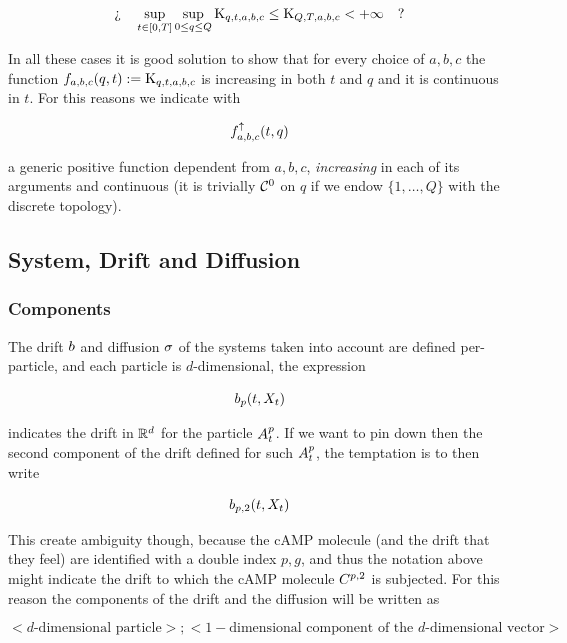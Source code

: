 \begin{equation*}
	\logQuest{
		\sup_{t \in [0,T]} \sup_{0\leq q \leq Q} \const_{q,t,a,b,c} \leq \const_{Q,T,a,b,c}  < +\infty
	}
\end{equation*}

In all these cases it is good solution to show that for every choice of $a,b,c$ the function $f_{a,b,c}(q,t) := \const_{q,t,a,b,c}$ is increasing in both $t$ and $q$ and it is continuous in $t$.
For this reasons we indicate with 

\begin{equation*}
	\Fup_{a,b,c} (t,q)
\end{equation*}

a generic positive function dependent from $a,b,c$, \emph{increasing} in each of its arguments and continuous (it is trivially $\Cspace^0$ on $q$ if we endow $\{1,\ldots, Q\}$ with the discrete topology).

\subsection{System, Drift and Diffusion}

\subsubsection{Components}

The drift $\drift$ and diffusion $\diffusion$ of the systems taken into account are defined per-particle, and each particle is $d$-dimensional, \eg the expression 

\begin{equation*}
	\drift_{p}(t, \sol_t)
\end{equation*}

indicates the drift in $\R^d$ for the particle $\amba_t^p$.
If we want to pin down then the second component of the drift defined for such $\amba_t^p$, the temptation is to then write

\begin{equation*}
	\drift_{p,2}(t, \sol_t)
\end{equation*}

This create ambiguity though, because the cAMP molecule (and the drift that they feel) are identified with a double index $p,g$, and thus the notation above might indicate the drift to which the cAMP molecule $\camp^{p,2}$ is subjected.
For this reason the components of the drift and the diffusion will be written as 

\begin{equation*}
	<\text{$d$-dimensional particle}>; <1-\text{dimensional component of the $d$-dimensional vector}>
\end{equation*}

